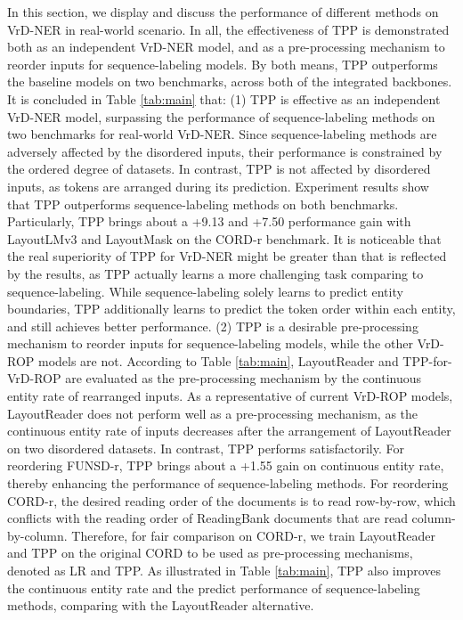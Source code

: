 \documentclass[11pt]{article}
\begin{document}
In this section, we display and discuss the performance of different methods on VrD-NER in real-world scenario.
In all, the effectiveness of TPP is demonstrated both as an independent VrD-NER model, and as a pre-processing mechanism to reorder inputs for sequence-labeling models. 
By both means, TPP outperforms the baseline models on two benchmarks, across both of the integrated backbones.
It is concluded in Table \ref{tab:main} that: 
(1) TPP is effective as an independent VrD-NER model, surpassing the performance of sequence-labeling methods on two benchmarks for real-world VrD-NER. 
Since sequence-labeling methods are adversely affected by the disordered inputs, their performance is constrained by the ordered degree of datasets. 
In contrast, TPP is not affected by disordered inputs, as tokens are arranged during its prediction. 
Experiment results show that TPP outperforms sequence-labeling methods on both benchmarks. Particularly, TPP brings about a +9.13 and +7.50 performance gain with LayoutLMv3 and LayoutMask on the CORD-r benchmark. 
It is noticeable that the real superiority of TPP for VrD-NER might be greater than that is reflected by the results, as TPP actually learns a more challenging task comparing to sequence-labeling. While sequence-labeling solely learns to predict entity boundaries, TPP additionally learns to predict the token order within each entity, and still achieves better performance. 
(2) TPP is a desirable pre-processing mechanism to reorder inputs for sequence-labeling models, while the other VrD-ROP models are not. 
According to Table \ref{tab:main}, LayoutReader and TPP-for-VrD-ROP are evaluated as the pre-processing mechanism by the continuous entity rate of rearranged inputs. 
As a representative of current VrD-ROP models, LayoutReader does not perform well as a pre-processing mechanism, as the continuous entity rate of inputs decreases after the arrangement of LayoutReader on two disordered datasets. 
In contrast, TPP performs satisfactorily. 
For reordering FUNSD-r, TPP brings about a +1.55 gain on continuous entity rate, thereby enhancing the performance of sequence-labeling methods.
For reordering CORD-r, the desired reading order of the documents is to read row-by-row, which conflicts with the reading order of ReadingBank documents that are read column-by-column. 
Therefore, for fair comparison on CORD-r, we train LayoutReader and TPP on the original CORD to be used as pre-processing mechanisms, denoted as LR and TPP.
As illustrated in Table \ref{tab:main}, TPP also improves the continuous entity rate and the predict performance of sequence-labeling methods, comparing with the LayoutReader alternative. 
\end{document}
